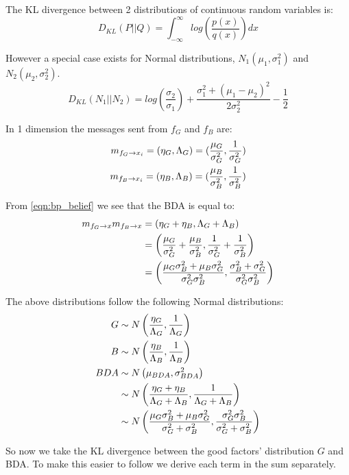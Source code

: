 The KL divergence between 2 distributions of continuous random variables is:
\begin{equation}
	D_{KL}(P || Q) = \int_{-\infty}^{\infty} log\left( \frac{p(x)}{q(x)} \right) dx
\end{equation}

However a special case exists for Normal distributions, $N_1(\mu_1, \sigma_1^2)$ and $N_2(\mu_2, \sigma_2^2)$.
\begin{equation}
	D_{KL}(N_1 || N_2) = log\left(\frac{\sigma_2}{\sigma_1}\right) + \frac{\sigma_1^2 + (\mu_1 - \mu_2)^2}{2\sigma_2^2} - \frac{1}{2}
\end{equation}

In 1 dimension the messages sent from $f_G$ and $f_B$ are:
\begin{eqnarray}
	m_{f_G \rightarrow x_i} = (\eta_G, \Lambda_G) = (\frac{\mu_G}{\sigma_G^2}, \frac{1}{\sigma_G^2})\\
	m_{f_B \rightarrow x_i} = (\eta_B, \Lambda_B) = (\frac{\mu_B}{\sigma_B^2}, \frac{1}{\sigma_B^2}) \label{eqn:attacker_msg}
\end{eqnarray}

From \ref{eqn:bp_belief} we see that the BDA is equal to:
\begin{align}
	m_{f_G \rightarrow x} m_{f_B \rightarrow x} 
	&= (\eta_G + \eta_B, \Lambda_G + \Lambda_B)\\
	&= \left(\frac{\mu_G}{\sigma_G^2} + \frac{\mu_B}{\sigma_B^2}, \frac{1}{\sigma_G^2} + \frac{1}{\sigma_B^2}\right)\\
	&= \left(\frac{\mu_G\sigma_B^2 + \mu_B\sigma_G^2}{\sigma_G^2 \sigma_B^2}, \frac{\sigma_B^2 + \sigma_G^2}{\sigma_G^2 \sigma_B^2}\right)
\end{align}

The above distributions follow the following Normal distributions:
\begin{align}
	G &\sim N\left(\frac{\eta_G}{\Lambda_G}, \frac{1}{\Lambda_G}\right)\\
	B &\sim N\left(\frac{\eta_B}{\Lambda_B}, \frac{1}{\Lambda_B}\right)\\
	BDA &\sim N\left(\mu_{BDA}, \sigma_{BDA}^2\right)\\
	&\sim N\left(\frac{\eta_G + \eta_B}{\Lambda_G + \Lambda_B}, \frac{1}{\Lambda_G + \Lambda_B}\right)\\
	&\sim N\left(\frac{\mu_G\sigma_B^2 + \mu_B\sigma_G^2}{\sigma_G^2 + \sigma_B^2}, \frac{\sigma_G^2 \sigma_B^2}{\sigma_G^2 + \sigma_B^2}\right) \label{eqn:bda_distribution}
\end{align}

So now we take the KL divergence between the good factors' distribution $G$ and BDA. To make this easier to follow we derive each term in the sum separately.

